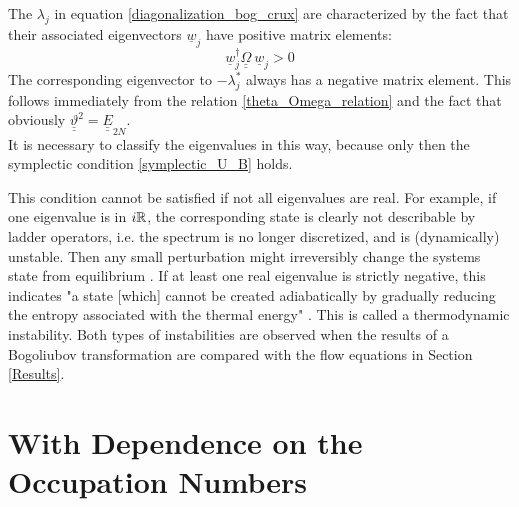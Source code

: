 The $ \lambda_j$ in equation \ref{diagonalization_bog_crux} are characterized by the fact that their associated eigenvectors $\underline w_j$ have positive matrix elements:
\begin{equation}
\underline w_j^\dagger{\underline{\underline{\Omega}}}\ \underline w_j>0
\end{equation}
The corresponding eigenvector to $-\lambda_j^*$ always has a negative matrix element. This follows immediately from the relation \ref{theta_Omega_relation} and the fact that obviously $\underline{\underline{\vartheta}}^2=\underline{\underline{E}}_{2N}$.\\
It is necessary to classify the eigenvalues in this way, because only then the symplectic condition \ref{symplectic_U_B} holds.  \par
This condition cannot be satisfied if not all eigenvalues are real. For example, if one eigenvalue is in $i\mathbb{R}$, the corresponding state is clearly not describable by ladder operators, i.e. the spectrum is no longer discretized, and is (dynamically) unstable. Then any small perturbation might irreversibly change the systems state from equilibrium \cite{PhysRevA.98.033610}. If at least one real eigenvalue is strictly negative, this indicates "a state [which] cannot be created adiabatically by gradually reducing the entropy associated with the thermal energy" \cite{PhysRevA.98.033610}. This is called a thermodynamic instability. Both types of instabilities are observed when the results of a Bogoliubov transformation are compared with the flow equations in Section \ref{Results}.
\section{With Dependence on the Occupation Numbers}
